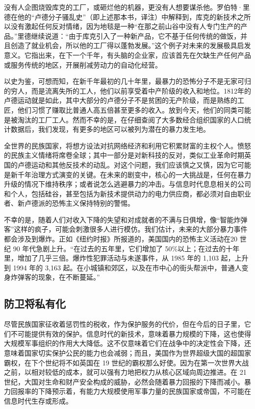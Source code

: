 没有人企图烧毁库克的工厂，或砸烂他的机器，更没有人想要谋杀他。罗伯特·里德在他的“卢德分子骚乱史”（即上述那本书，译注）中解释到，库克的新技术之所以没有激起任何反对情绪，因为地毯是一种“在那之前山谷中没有人专门生产的产品。”里德继续说道：“由于库克引入了一种新产品，它不基于任何传统的做饭，并且创造了就业机会，所以他的工厂得以蓬勃发展。”这个例子对未来的发展极具启发意义。它指出来，在下一个千年，有头脑的企业家，应该首先在欠缺生产任何产品或服务传统的地区，开展削减劳动力的自动化经营。

以史为鉴，可想而知，在新千年最初的几十年里，最暴力的恐怖分子不是无家可归的穷人，而是流离失所的工人，他们以前享受着中产阶级的收入和地位。1812年的卢德运动就是如此，其中大部分的卢德分子不是贫困的无产阶级，而是熟练的工匠，他们习惯了赚取比普通人高五倍甚至更多的收入。放到今天，他们的同类可能是被淘汰的工厂工人。然而不幸的是，在仔细查阅了大多数经合组织国家的人口统计数据后，我们发现，有更多的地区可以被列为潜在的暴力发生地。

全世界的民族国家，将想方设法对抗网络经济和利用它积累财富的主权个人。愤怒的民族主义情绪将席卷全球；其中一部分是对新科技的反对，类似工业革命时期英国的卢德运动和其他反技术的动乱。对这个问题，我们应该慎之又慎，因为它可能是新千年治理方式演变的关键。在未来的剧变中，核心的一大挑战是，任何在暴力升级的情况下维持秩序；或者说怎么逃避暴力的冲击。与信息时代息息相关的公司和个人，包括硅谷，甚至包括为新技术提供动力的电力供应商，都必须对自由职业者、新卢德派的恐怖主义保持特别的警惕。

不幸的是，随着人们对收入下降的失望和对成就者的不满与日俱增，像“智能炸弹客”这样的疯子，可能会刺激很多人进行模仿。我们估计，未来的大部分暴力事件都会涉及到爆炸。正如《纽约时报》所报道的，美国国内的恐怖主义活动在20 世纪 90 年代急剧上升。“在过去的五年里，它们增加了 50\%以上；在过去的十年里，增加了几乎三倍。爆炸性犯罪活动与未遂事件，从 1985 年的 1,103 起，上升到 1994 年的 3,163 起。在小城镇和郊区，以及在市中心的街头帮派中，普通人变身炸弹客的现象，在不断蔓延。”

\subsection{防卫将私有化}
尽管民族国家征收着惩罚性的税收，作为保护服务的代价，但在今后的日子里，它们不可能提供有效的保护。信息时代的新技术，意味着暴力规模的下降，这也使得大规模军事组织的作用大大降低。这不仅意味着它们在战争中的决定性会下降，还意味着国家切实保护公民的能力也会减弱；而且，美国作为世界超级大国的超国家霸权，在下个世纪将不如英国在 19 世纪的霸权那么好使。因为在第一次世界大战之前，以相对较低的成本，就可以强有力地把权力从核心区域向周边推进。在 21 世纪，大国对生命和财产安全构成的威胁，必然会随着暴力回报的下降而减小。暴力回报率的下降预示着，有能力大规模使用军事力量的民族国家或帝国，不可能在信息时代生存或形成。

